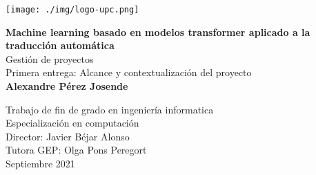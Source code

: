 \begin{titlepage}
\begin{center}

\texttt{[image: ./img/logo-upc.png]}\\[2.0cm]

\vbox{ }

{\LARGE \bfseries  Machine learning basado en modelos transformer aplicado a la traducción automática}\\[1.0cm]
{\Large Gestión de proyectos}\\[0.15cm]
{\large Primera entrega: Alcance y contextualización del proyecto}\\[3.0cm]

{\large \bfseries Alexandre Pérez Josende}
\vfill

{\normalsize Trabajo de fin de grado en ingeniería informatica}\\
{\normalsize Especialización en computación}\\[0.4cm]

{\normalsize Director: Javier Béjar Alonso}\\
{\normalsize Tutora GEP: Olga Pons Peregort}\\[0.4cm]

{\normalsize Septiembre 2021}

\end{center}
\end{titlepage}